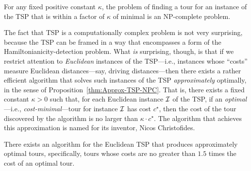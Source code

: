 \begin{prop}
\label{thm:Approx-TSP-NPC}
For any fixed positive constant $\kappa$, the problem of finding a
tour for an instance of the TSP that is within a factor of $\kappa$ of
minimal is an {\sf NP}-complete problem.
\end{prop}


The fact that TSP is a computationally complex problem is not very
surprising, because the TSP can be framed in a way that encompasses a
form of the Hamiltonianicity-detection problem.
What {\em is} surprising, though, is that if we restrict attention to
{\em Euclidean} instances of the TSP---i.e., instances whose ``costs''
measure Euclidean  distances---say,
driving distances---then there exists a rather efficient algorithm
that solves such instances of the TSP {\em approximately} optimally,
in the sense of Proposition~\ref{thm:Approx-TSP-NPC}.  That is, there
exists a fixed constant $\kappa > 0$ such that, for each Euclidean
instance $\mbox{$\cal I$}$ of the TSP, if an {\em optimal}---i.e., {\em
  cost-minimal}---tour for instance $\mbox{$\cal I$}$ has cost $c^\star$, then the
cost of the tour discovered by the algorithm is no larger than $\kappa
\cdot c^\star$.  The algorithm that achieves this approximation is
named for its inventor, Nicos Christofides.


\begin{prop}
There exists an algorithm for the Euclidean TSP that produces
approximately optimal tours, specifically, tours whose costs are no
greater than $1.5$ times the cost of an optimal tour.
\end{prop}

